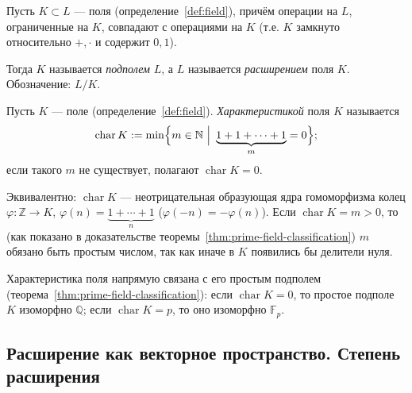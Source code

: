 \documentclass[12pt]{article}
\begin{document}
    \begin{definition}\label{def:extension}
    	Пусть $K \subset L$ --- поля (определение~\ref{def:field}), причём операции на $L$, ограниченные на $K$, совпадают с операциями на $K$ (т.е. $K$ замкнуто относительно $+, \cdot$ и содержит $0, 1$).
    
    	Тогда $K$ называется \emph{подполем} $L$, а $L$ называется \emph{расширением} поля $K$. Обозначение: $L/K$.
    \end{definition}
    
    \begin{definition}\label{def:characteristic}
    	Пусть $K$ --- поле (определение~\ref{def:field}). \emph{Характеристикой} поля $K$ называется
    	\[
    	\operatorname{char} K := \min \Bigl\{ m \in \mathbb{N} \ \Big| \ \underbrace{1+1+\cdots+1}_{m} = 0 \Bigr\};
    	\]
    	если такого $m$ не существует, полагают $\operatorname{char} K = 0$.

    	Эквивалентно: $\operatorname{char} K$ --- неотрицательная образующая ядра гомоморфизма колец $\varphi: \mathbb{Z} \to K$, $\varphi(n) = \underbrace{1+\cdots+1}_{n}$ ($\varphi(-n) = -\varphi(n)$). Если $\operatorname{char} K = m > 0$, то (как показано в доказательстве теоремы~\ref{thm:prime-field-classification}) $m$ обязано быть простым числом, так как иначе в $K$ появились бы делители нуля.
    \end{definition}
    
    \begin{note}
    	Характеристика поля напрямую связана с его простым подполем (теорема~\ref{thm:prime-field-classification}): если $\operatorname{char} K = 0$, то простое подполе $K$ изоморфно $\mathbb{Q}$; если $\operatorname{char} K = p$, то оно изоморфно $\mathbb{F}_p$.
    \end{note}
    
    \subsection{Расширение как векторное пространство. Степень расширения}
    
\end{document}
